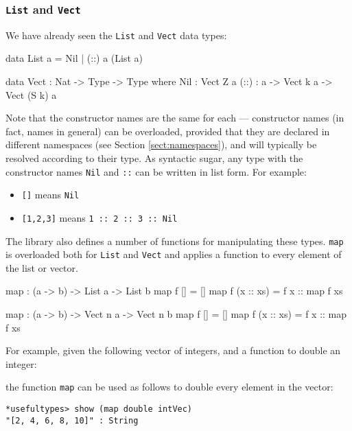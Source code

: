 \subsubsection{\texttt{List} and \texttt{Vect}}

We have already seen the \texttt{List} and \texttt{Vect} data types:

\begin{code}
data List a = Nil | (::) a (List a)

data Vect : Nat -> Type -> Type where
   Nil  : Vect Z a
   (::) : a -> Vect k a -> Vect (S k) a
\end{code}

\noindent
Note that the constructor names are the same for each --- constructor names (in fact, names in general) can be overloaded, provided that they are declared in different namespaces (see Section \ref{sect:namespaces}), and will typically be resolved according to their type.
As syntactic sugar, any type with the constructor names \texttt{Nil} and \texttt{::} can be written in list form.
For example:

\begin{itemize}
\item \texttt{[]} means \texttt{Nil}
\item \texttt{[1,2,3]} means \texttt{1 :: 2 :: 3 :: Nil}
\end{itemize}

\noindent
The library also defines a number of functions for manipulating these types.
\texttt{map} is overloaded both for \texttt{List} and \texttt{Vect} and applies a function to every element of the list or vector.

\begin{code}
map : (a -> b) -> List a -> List b
map f []        = []
map f (x :: xs) = f x :: map f xs

map : (a -> b) -> Vect n a -> Vect n b
map f []        = []
map f (x :: xs) = f x :: map f xs
\end{code}


\noindent
For example, given the following vector of integers, and a function to double an integer:


\noindent
the function \texttt{map} can be used as follows to double every element in the vector:

\begin{lstlisting}[style=stdout]
*usefultypes> show (map double intVec)
"[2, 4, 6, 8, 10]" : String
\end{lstlisting}

